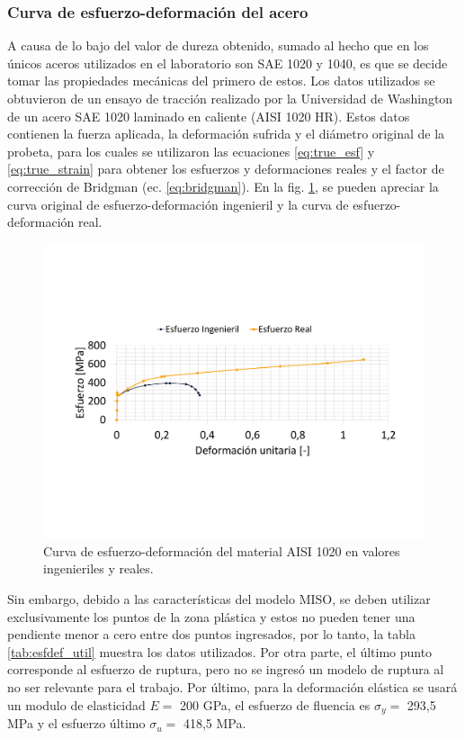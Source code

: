 \subsubsection{Curva de esfuerzo-deformación del acero}
A causa de lo bajo del valor de dureza obtenido, sumado al hecho que en los únicos aceros utilizados en el laboratorio son SAE 1020 y 1040, es que se decide tomar las propiedades mecánicas del primero de estos. Los datos utilizados se obtuvieron de un ensayo de tracción realizado por la Universidad de Washington de un acero SAE 1020 laminado en caliente (AISI 1020 HR)\cite{1020data}. Estos datos contienen la fuerza aplicada, la deformación sufrida y el diámetro original de la probeta, para los cuales se utilizaron las ecuaciones \ref{eq:true_esf} y \ref{eq:true_strain} para obtener los esfuerzos y deformaciones reales y el factor de corrección de Bridgman (ec. \ref{eq:bridgman}). En la fig. \ref{fig:esf_realing}, se pueden apreciar la curva original de esfuerzo-deformación ingenieril y la curva de esfuerzo-deformación real. 

\begin{figure}[h]
\centering
\includegraphics[width=1\linewidth, trim={2cm 6cm 2cm 5cm},clip]{Imagenes/esf_real_ing.pdf}
\caption{Curva de esfuerzo-deformación del material AISI 1020 en valores ingenieriles y reales.}
\label{fig:esf_realing}
\end{figure}

Sin embargo, debido a las características del modelo MISO, se deben utilizar exclusivamente los puntos de la zona plástica y estos no pueden tener una pendiente menor a cero entre dos puntos ingresados, por lo tanto, la tabla \ref{tab:esfdef_util} muestra los datos utilizados. Por otra parte, el último punto corresponde al esfuerzo de ruptura, pero no se ingresó un modelo de ruptura al no ser relevante para el trabajo. 
\newpage
Por último, para la deformación elástica se usará un modulo de elasticidad $E =$ 200 GPa, el esfuerzo de fluencia es $\sigma_y=$ 293,5 MPa y el esfuerzo último $\sigma_u =$ 418,5 MPa.

